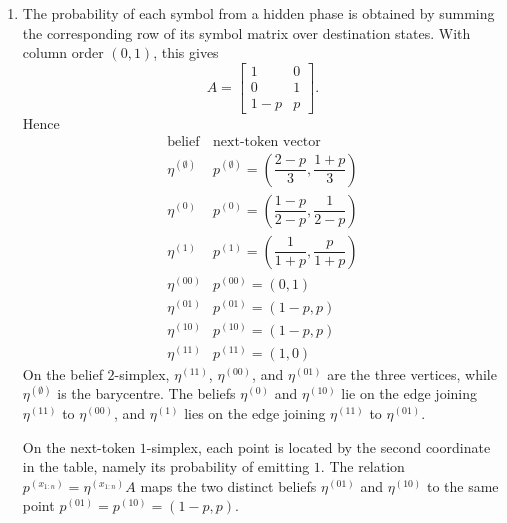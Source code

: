 \documentclass[11pt]{article}
\begin{document}
\begin{solution}[ex:p3-2]
\begin{enumerate}
\begin{enumerate}
          \item The generator has access to its actual hidden phase and needs
            only the three states $0$, $1$, and $R$. An observer begins with
            an unknown phase and must also represent four transient posterior
            distributions before synchronising with the generator. This
            example therefore shows that inference can require a richer state
            description than a particular generative presentation.
        \end{enumerate}

      \item The probability of each symbol from a hidden phase is obtained by
        summing the corresponding row of its symbol matrix over destination
        states. With column order $(0,1)$, this gives
        \[
          A=
          \begin{bmatrix}
            1&0\\
            0&1\\
            1-p&p
          \end{bmatrix}.
        \]
        Hence
        \[
          \begin{array}{c|c}
            \text{belief} & \text{next-token vector}\\
            \hline
            \eta^{(\emptyset)} &
              p^{(\emptyset)}=
              \left(\dfrac{2-p}{3},\dfrac{1+p}{3}\right)\\[1mm]
            \eta^{(0)} &
              p^{(0)}=
              \left(\dfrac{1-p}{2-p},\dfrac{1}{2-p}\right)\\[1mm]
            \eta^{(1)} &
              p^{(1)}=
              \left(\dfrac{1}{1+p},\dfrac{p}{1+p}\right)\\[1mm]
            \eta^{(00)} & p^{(00)}=(0,1)\\
            \eta^{(01)} & p^{(01)}=(1-p,p)\\
            \eta^{(10)} & p^{(10)}=(1-p,p)\\
            \eta^{(11)} & p^{(11)}=(1,0)
          \end{array}
        \]
        On the belief $2$-simplex, $\eta^{(11)}$, $\eta^{(00)}$, and
        $\eta^{(01)}$ are the three vertices, while
        $\eta^{(\emptyset)}$ is the barycentre. The beliefs $\eta^{(0)}$ and
        $\eta^{(10)}$ lie on the edge joining $\eta^{(11)}$ to
        $\eta^{(00)}$, and $\eta^{(1)}$ lies on the edge joining
        $\eta^{(11)}$ to $\eta^{(01)}$.

        On the next-token $1$-simplex, each point is located by the second
        coordinate in the table, namely its probability of emitting $1$.
        The relation $p^{(x_{1:n})}=\eta^{(x_{1:n})}A$ maps the two distinct
        beliefs $\eta^{(01)}$ and $\eta^{(10)}$ to the same point
        $p^{(01)}=p^{(10)}=(1-p,p)$.


\end{enumerate}
\end{solution}
\end{document}
